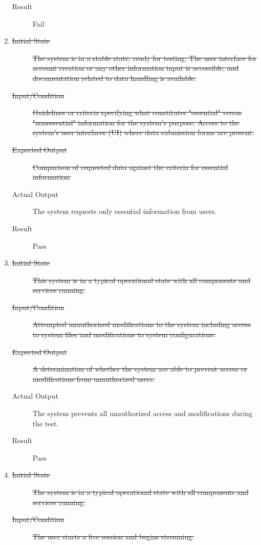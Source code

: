 \documentclass[12pt, titlepage]{article}
\begin{document}
\begin{enumerate}[NFR-T1]
\begin{description}
    \item[Result] Fail
    \end{description}
  \addtocounter{enumi}{2}
  \item \label{NFRT22}
    \begin{description}
    \item[\sout{Initial State}]\sout{ The system is in a stable state, ready for testing. The
      user interface for account creation or any other information input is
      accessible, and documentation related to data handling is available.
    }
		\item[\sout{Input/Condition}]\sout{ Guidelines or criteria specifying what constitutes
      "essential" versus "nonessential" information for the system’s purpose.
      Access to the system's user interfaces (UI) where data submission forms
      are present.
    }
		\item[\sout{Expected Output}]\sout{ Comparison of requested data against the criteria for
      essential information.
    }
		\item[Actual Output] The system requests only essential information from users.
    \item[Result] Pass
    \end{description}
  \item \label{NFRT23}
    \begin{description}
    \item[\sout{Initial State}]\sout{ This system is in a typical operational state with all
      components and services running.
    }
		\item[\sout{Input/Condition}]\sout{ Attempted unauthorized modifications to the system
      including access to system files and modifications to system
      configurations.
    }
		\item[\sout{Expected Output}]\sout{ A determination of whether the system are able to
      prevent access or modifications from unauthorized users.
    }
		\item[Actual Output] The system prevents all unauthorized access and
      modifications during the test.
    \item[Result] Pass
    \end{description}
  \item \label{NFRT24}
    \begin{description}
    \item[\sout{Initial State}]\sout{ The system is in a typical operational state with all
      components and services running.
    }
		\item[\sout{Input/Condition}]\sout{ The user starts a live session and begins streaming.
}
\end{description}
\end{enumerate}
\end{document}
